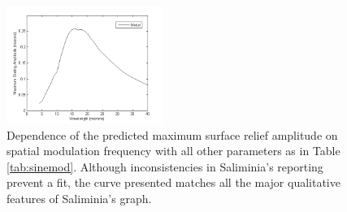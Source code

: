 \documentclass[twocolumn,showpacs,preprintnumbers,amsmath,amssymb]{revtex4}
\begin{document}
\begin{figure}
                                                                                                                                                                                                                                                                                                                                                                                                                                                                                                                                                                                                                                                                                                                                                                                                                                                                                                                                                                                                                                                                  \includegraphics[width=2in]{figure/saliminiadisp.png}
                                                                                                                                                                                                                                                                                                                                                                                                                                                                                                                                                                                                                                                                                                                                                                                                                                                                                                                                                                                                                                                                \caption{Dependence of the predicted maximum surface relief amplitude on spatial modulation frequency with all other parameters as in Table \ref{tab:sinemod}. Although inconsistencies in Saliminia's reporting prevent a fit, the curve presented matches all the major qualitative features of Saliminia's graph.}

\end{figure}
\end{document}
